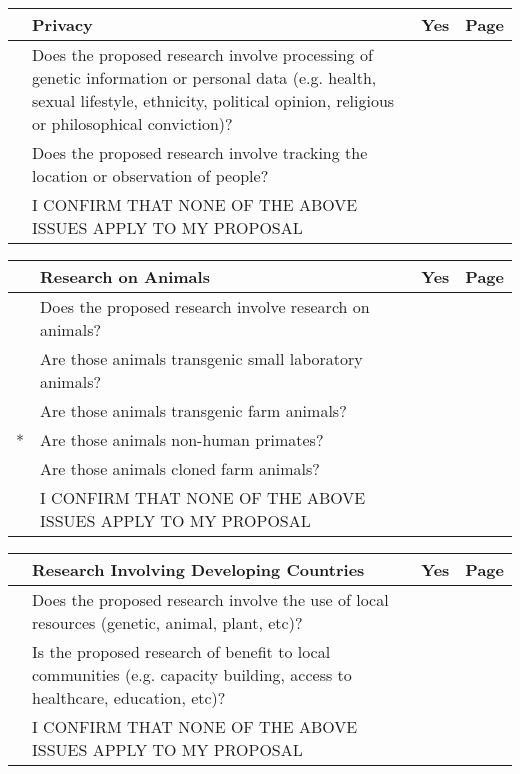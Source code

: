 \documentclass[11pt]{ltxdoc}
\begin{document}
\vspace{0.5cm}
\begin{tabularx}{\linewidth}{ | c | X | c | c | }
\rowcolor{black} & {\centering\arraybackslash \color{white} \bf Privacy} & {\color{white} \bf Yes} & {\color{white} \bf Page} \\ \hline
   & Does the proposed research involve processing of genetic information or personal data (e.g. health, sexual lifestyle, ethnicity, political opinion, religious or philosophical conviction)? & & \\ \hline
   & Does the proposed research involve tracking the location or observation of people? & & \\ \hline
   & I CONFIRM THAT NONE OF THE ABOVE ISSUES APPLY TO MY PROPOSAL & & \cellcolor[gray]{0.8}\\ \hline
\end{tabularx}

\vspace{0.5cm}
\begin{tabularx}{\linewidth}{ | c | X | c | c | }
\rowcolor{black} & {\centering\arraybackslash \color{white} \bf Research on Animals} & {\color{white} \bf Yes} & {\color{white} \bf Page} \\ \hline
   & Does the proposed research involve research on animals?      & & \\ \hline
   & Are those animals transgenic small laboratory animals?       & & \\ \hline
   & Are those animals transgenic farm animals?                   & & \\ \hline
 * & Are those animals non-human primates?                        & & \\ \hline
   & Are those animals cloned farm animals?                       & & \\ \hline
   & I CONFIRM THAT NONE OF THE ABOVE ISSUES APPLY TO MY PROPOSAL & & \cellcolor[gray]{0.8}\\ \hline
\end{tabularx}

\vspace{0.5cm}
\begin{tabularx}{\linewidth}{ | c | X | c | c | }
\rowcolor{black} & {\centering\arraybackslash \color{white} \bf Research Involving Developing Countries} & {\color{white} \bf Yes} & {\color{white} \bf Page} \\ \hline
   & Does the proposed research involve the use of local resources (genetic, animal, plant, etc)?                             & & \\ \hline
   & Is the proposed research of benefit to local communities (e.g. capacity building, access to healthcare, education, etc)? & & \\ \hline
   & I CONFIRM THAT NONE OF THE ABOVE ISSUES APPLY TO MY PROPOSAL                                                             & & \cellcolor[gray]{0.8}\\ \hline
\end{tabularx}
\end{document}
